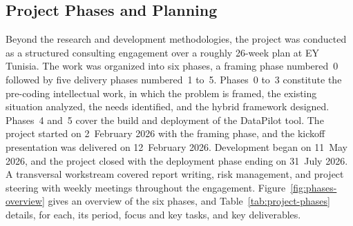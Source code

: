 \subsection{Project Phases and Planning}

Beyond the research and development methodologies, the project was conducted as a structured consulting engagement over a roughly 26-week plan at EY Tunisia. The work was organized into six phases, a framing phase numbered~0 followed by five delivery phases numbered~1 to~5. Phases~0 to~3 constitute the pre-coding intellectual work, in which the problem is framed, the existing situation analyzed, the needs identified, and the hybrid framework designed. Phases~4 and~5 cover the build and deployment of the DataPilot tool. The project started on 2~February 2026 with the framing phase, and the kickoff presentation was delivered on 12~February 2026. Development began on 11~May 2026, and the project closed with the deployment phase ending on 31~July 2026. A transversal workstream covered report writing, risk management, and project steering with weekly meetings throughout the engagement. Figure~\ref{fig:phases-overview} gives an overview of the six phases, and Table~\ref{tab:project-phases} details, for each, its period, focus and key tasks, and key deliverables.

